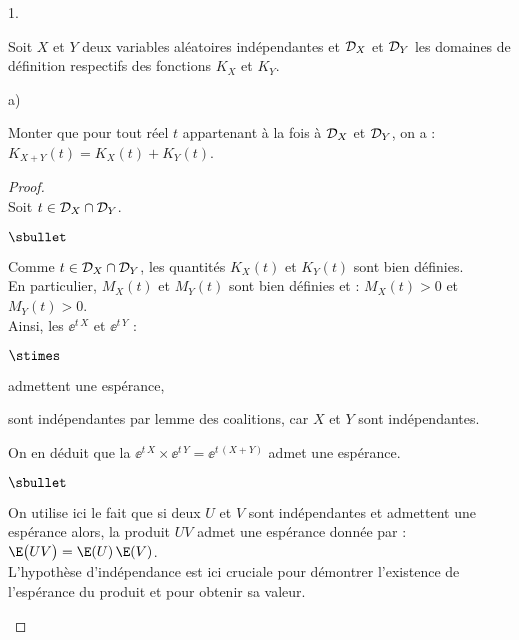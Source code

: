\documentclass[11pt]{article}%
\begin{document}
\begin{noliste}{1.}
  
  
\item Soit $X$ et $Y$ deux variables aléatoires indépendantes et
  ${\cal D}_X$ et ${\cal D}_Y$ les domaines de définition respectifs
  des fonctions $K_X$ et $K_Y$.
  \begin{noliste}{a)}
    \setlength{\itemsep}{2mm}
  \item Monter que pour tout réel $t$ appartenant à la fois à ${\cal
      D}_X$ et ${\cal D}_Y$, on a : $K_{X+Y}(t) = K_X(t) + K_Y(t)$.
    \begin{proof}~\\
      Soit $t \in {\cal D}_X \cap {\cal D}_Y$.
      \begin{noliste}{$\sbullet$}
      \item Comme $t \in {\cal D}_X \cap {\cal D}_Y$, les quantités
        $K_X(t)$ et $K_Y(t)$ sont bien définies.\\
        En particulier, $M_X(t)$ et $M_Y(t)$ sont bien définies et :
        $M_X(t) >0$ et $M_Y(t) >0$.\\
        Ainsi, les \var $\ee^{t \, X}$ et $\ee^{t \, Y}$ :
        \begin{noliste}{$\stimes$}
        \item admettent une espérance,
          
        \item sont indépendantes par lemme des coalitions, car $X$ et
          $Y$ sont indépendantes.
        \end{noliste}
        On en déduit que la \var $\ee^{t \, X} \times \ee^{t \, Y} =
        \ee^{t \, (X+Y)}$ admet une espérance. %
        \begin{remarkL}{.98}
          \begin{noliste}{$\sbullet$}
          \item On utilise ici le fait que si deux \var $U$ et $V$
            sont indépendantes et admettent une espérance alors, la
            \var produit $UV$ admet une espérance donnée par :
            $\E\big( UV \big) = \E(U) \, \E(V)$.\\
            L'hypothèse d'indépendance est ici cruciale pour démontrer
            l'existence de l'espérance du produit et pour obtenir sa
            valeur.
          \end{noliste}
        \end{remarkL}


        \newpage



\end{noliste}
\end{proof}
\end{noliste}
\end{noliste}
\end{document}
